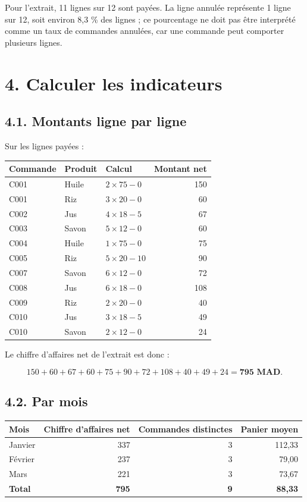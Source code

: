 \documentclass[
  french,
  letterpaper,
  open=any]{scrbook}
\newcounter{none} %
\theoremstyle{definition}
\theoremstyle{definition}
\theoremstyle{remark}
\begin{document}
Pour l'extrait, 11 lignes sur 12 sont payées. La ligne annulée
représente 1 ligne sur 12, soit environ 8,3 \% des lignes ; ce
pourcentage ne doit pas être interprété comme un taux de commandes
annulées, car une commande peut comporter plusieurs lignes.

\section{4. Calculer les indicateurs}\label{calculer-les-indicateurs}

\subsection{4.1. Montants ligne par
ligne}\label{montants-ligne-par-ligne}

Sur les lignes payées :

{\def\LTcaptype{none} %
\begin{longtable}[]{@{}lllr@{}}
\toprule\noalign{}
Commande & Produit & Calcul & Montant net \\
\midrule\noalign{}
\endhead
\bottomrule\noalign{}
\endlastfoot
C001 & Huile & \(2\times75-0\) & 150 \\
C001 & Riz & \(3\times20-0\) & 60 \\
C002 & Jus & \(4\times18-5\) & 67 \\
C003 & Savon & \(5\times12-0\) & 60 \\
C004 & Huile & \(1\times75-0\) & 75 \\
C005 & Riz & \(5\times20-10\) & 90 \\
C007 & Savon & \(6\times12-0\) & 72 \\
C008 & Jus & \(6\times18-0\) & 108 \\
C009 & Riz & \(2\times20-0\) & 40 \\
C010 & Jus & \(3\times18-5\) & 49 \\
C010 & Savon & \(2\times12-0\) & 24 \\
\end{longtable}
}

Le chiffre d'affaires net de l'extrait est donc :

\[
150+60+67+60+75+90+72+108+40+49+24
=\textbf{795 MAD}.
\]

\subsection{4.2. Par mois}\label{par-mois}

{\def\LTcaptype{none} %
\begin{longtable}[]{@{}lrrr@{}}
\toprule\noalign{}
Mois & Chiffre d'affaires net & Commandes distinctes & Panier moyen \\
\midrule\noalign{}
\endhead
\bottomrule\noalign{}
\endlastfoot
Janvier & 337 & 3 & 112,33 \\
Février & 237 & 3 & 79,00 \\
Mars & 221 & 3 & 73,67 \\
\textbf{Total} & \textbf{795} & \textbf{9} & \textbf{88,33} \\
\end{longtable}
}
\end{document}
